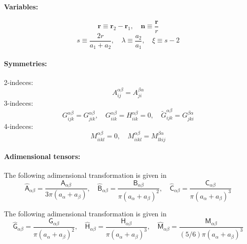\documentclass[11pt]{scrartcl}
\newcommand{\tens}[1]{\bm{\mathsf{#1}}}
\begin{document}
\paragraph{Variables:}
\begin{equation}
 \bm{r} \equiv \bm{r}_2 - \bm{r}_1, 
\quad
 \bm{n} \equiv \frac{\bm{r}}{r}
\end{equation}
\begin{equation}
  s \equiv \frac{2r}{a_{1}+ a_{2}}, \quad
 \lambda \equiv \frac{a_2}{a_1}, \quad
\xi \equiv s - 2
\end{equation}



\paragraph{Symmetries:}
2-indeces:
\begin{equation}
 A_{ij}^{\alpha\beta} =  A_{ji}^{\beta\alpha}
\end{equation}
3-indeces:
\begin{equation}
 G_{ijk}^{\alpha\beta} =   G_{jik}^{\alpha\beta} , \quad 
 G_{iik}^{\alpha\beta} =   H_{iik}^{\alpha\beta}  = 0, \quad 
 \tilde{G}_{ijk}^{\alpha\beta}  =  G_{jki}^{\beta\alpha} 
\end{equation}
4-indeces:
\begin{equation}
 M_{iikl}^{\alpha\beta} = 0,
\quad 
 M_{iikl}^{\alpha\beta} =  M_{lkij}^{\beta\alpha} 
\end{equation}

\paragraph{Adimensional tensors:}

The following adimensional transformation is given in \citet{Jeffrey_1984}
\begin{equation}
 \hat{\tens{A}}_{\alpha\beta}
= \frac{\tens{A}_{\alpha\beta}}{3\pi(a_{\alpha} + a_{\beta})},
\quad
 \hat{\tens{B}}_{\alpha\beta}
= \frac{\tens{B}_{\alpha\beta}}{\pi(a_{\alpha}+ a_{\beta})^2},
\quad
 \hat{\tens{C}}_{\alpha\beta}
= \frac{\tens{C}_{\alpha\beta}}{\pi(a_{\alpha}+ a_{\beta})^3}
\end{equation}

The following adimensional transformation is given in \citet{Jeffrey_1992}
\begin{equation}
 \hat{\tens{G}}_{\alpha\beta}
= \frac{\tens{G}_{\alpha\beta}}{\pi(a_{\alpha} + a_{\beta})^2},
\quad
 \hat{\tens{H}}_{\alpha\beta}
= \frac{\tens{H}_{\alpha\beta}}{\pi(a_{\alpha}+ a_{\beta})^3},
\quad
 \hat{\tens{M}}_{\alpha\beta}
= \frac{\tens{M}_{\alpha\beta}}{(5/6)\pi(a_{\alpha}+ a_{\beta})^3}
\end{equation}
\end{document}
